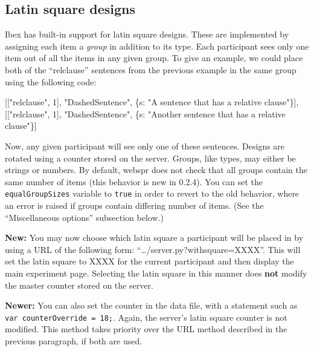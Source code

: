 \documentclass[]{article}
\newenvironment{Shaded}{}{}
\newcommand{\DataTypeTok}[1]{\textcolor[rgb]{0.56,0.13,0.00}{{#1}}}
\newcommand{\DecValTok}[1]{\textcolor[rgb]{0.25,0.63,0.44}{{#1}}}
\newcommand{\StringTok}[1]{\textcolor[rgb]{0.25,0.44,0.63}{{#1}}}
\newcommand{\NormalTok}[1]{{#1}}
\begin{document}
\subsection{Latin square designs}\label{latin-square-designs}

Ibex has built-in support for latin square designs. These are
implemented by assigning each item a \emph{group} in addition to its
type. Each participant sees only one item out of all the items in any
given group. To give an example, we could place both of the
``relclause'' sentences from the previous example in the same group
using the following code:

\begin{Shaded}
\begin{Highlighting}[]
    \NormalTok{[[}\StringTok{"relclause"}\NormalTok{, }\DecValTok{1}\NormalTok{], }\StringTok{"DashedSentence"}\NormalTok{, \{}\DataTypeTok{s}\NormalTok{: }\StringTok{"A sentence that has a relative clause"}\NormalTok{\}],}
    \NormalTok{[[}\StringTok{"relclause"}\NormalTok{, }\DecValTok{1}\NormalTok{], }\StringTok{"DashedSentence"}\NormalTok{, \{}\DataTypeTok{s}\NormalTok{: }\StringTok{"Another sentence that has a relative clause"}\NormalTok{\}]}
\end{Highlighting}
\end{Shaded}

Now, any given participant will see only one of these sentences. Designs
are rotated using a counter stored on the server. Groups, like types,
may either be strings or numbers. By default, webspr does not check that
all groups contain the same number of items (this behavior is new in
0.2.4). You can set the \texttt{equalGroupSizes} variable to
\texttt{true} in order to revert to the old behavior, where an error is
raised if groups contain differing number of items. (See the
``Miscellaneous options'' subsection below.)

\textbf{New:} You may now choose which latin square a participant will
be placed in by using a URL of the following form:
``\ldots{}/server.py?withsquare=XXXX''. This will set the latin square
to XXXX for the current participant and then display the main experiment
page. Selecting the latin square in this manner does \textbf{not} modify
the master counter stored on the server.

\textbf{Newer:} You can also set the counter in the data file, with a
statement such as \texttt{var\ counterOverride\ =\ 18;}. Again, the
server's latin square counter is not modified. This method takes
priority over the URL method described in the previous paragraph, if
both are used.
\end{document}
